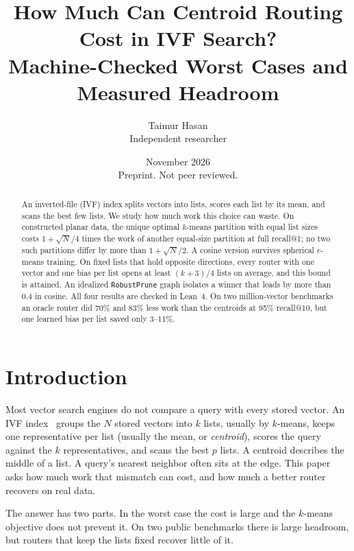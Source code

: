 \documentclass[11pt]{article}
\title{How Much Can Centroid Routing Cost in IVF Search?\\[2pt]
\large Machine-Checked Worst Cases and Measured Headroom}
\author{Taimur Hasan\\\small Independent researcher}
\date{November 2026\\\small Preprint. Not peer reviewed.}
\theoremstyle{definition}
\theoremstyle{remark}
\begin{document}
\maketitle

\begin{abstract}
An inverted-file (IVF) index splits vectors into lists, scores each list by its mean, and scans the best few lists. We study how much work this choice can waste. On constructed planar data, the unique optimal $k$-means partition with equal list sizes costs $1+\sqrt N/4$ times the work of another equal-size partition at full recall@1; no two such partitions differ by more than $1+\sqrt N/2$. A cosine version survives spherical $e$-means training. On fixed lists that hold opposite directions, every router with one vector and one bias per list opens at least $(k+3)/4$ lists on average, and this bound is attained. An idealized \texttt{RobustPrune} graph isolates a winner that leads by more than $0.4$ in cosine. All four results are checked in Lean~4. On two million-vector benchmarks an oracle router did 70\% and 83\% less work than the centroids at 95\% recall@10, but one learned bias per list saved only 3--11\%.
\end{abstract}

\section{Introduction}

Most vector search engines do not compare a query with every stored vector. An IVF index~\cite{jegou2011pq,douze2024faiss} groups the $N$ stored vectors into $k$ lists, usually by $k$-means, keeps one representative per list (usually the mean, or \emph{centroid}), scores the query against the $k$ representatives, and scans the best $p$ lists. A centroid describes the middle of a list. A query's nearest neighbor often sits at the edge. This paper asks how much work that mismatch can cost, and how much a better router recovers on real data.

The answer has two parts. In the worst case the cost is large and the $k$-means objective does not prevent it. On two public benchmarks there is large headroom, but routers that keep the lists fixed recover little of it.
\end{document}
